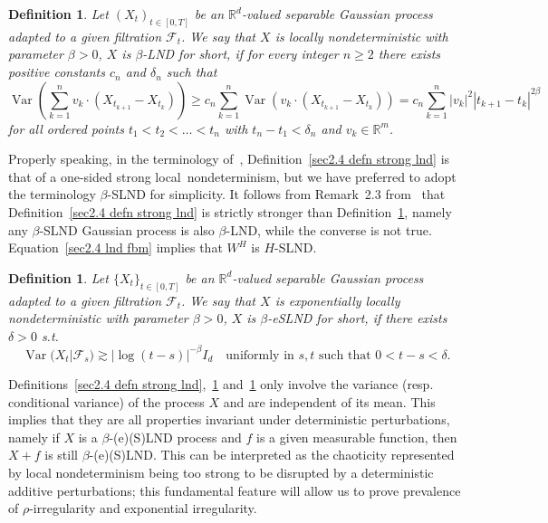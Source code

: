 \documentclass[10pt]{article}
\newcommand{\nobracket}{}
\newcommand{\tmop}[1]{\ensuremath{\operatorname{#1}}}
\newtheorem{definition}[theorem]{Definition}
\begin{document}
\begin{definition}
  \label{sec2.4 defn lnd}Let $(X_t)_{t \in [0, T]}$ be an
  $\mathbb{R}^d$-valued separable Gaussian process adapted to a given
  filtration $\mathcal{F}_t$. We say that $X$ is locally nondeterministic with
  parameter $\beta > 0$, $X$ is $\beta$\mbox{-}LND for short, if for every
  integer $n \geqslant 2$ there exists positive constants $c_n$ and $\delta_n$
  such that
  \begin{equation}
    \tmop{Var} \left( \sum_{k = 1}^n v_k \cdot (X_{t_{k + 1}} - X_{t_k})
    \right) \geqslant c_n \sum_{k = 1}^n \tmop{Var} (v_k \cdot (X_{t_{k + 1}}
    - X_{t_k})) = c_n \sum_{k = 1}^n | v_k |^2  | t_{k + 1} - t_k |^{2 \beta}
    \label{sec2.4 defn lnd eq}
  \end{equation}
  for all ordered points $t_1 < t_2 < \ldots < t_n$ with $t_n - t_1 <
  \delta_n$ and $v_k \in \mathbb{R}^m$.
\end{definition}

Properly speaking, in the terminology of~{\cite{xiao}}, Definition~\ref{sec2.4
defn strong lnd} is that of a one\mbox{-}sided strong local~nondeterminism,
but we have preferred to adopt the terminology $\beta$\mbox{-}SLND for
simplicity. It follows from Remark~2.3 from~{\cite{xiao}} that
Definition~\ref{sec2.4 defn strong lnd} is strictly stronger than
Definition~\ref{sec2.4 defn lnd}, namely any $\beta$\mbox{-}SLND Gaussian
process is also $\beta$\mbox{-}LND, while the converse is not true.
Equation~{\eqref{sec2.4 lnd fbm}} implies that $W^H$ is $H$\mbox{-}SLND.

\begin{definition}
  \label{sec2.4 defn exp lnd}Let $\{ X_t \}_{t \in [0, T]}$ be an
  $\mathbb{R}^d$-valued separable Gaussian process adapted to a given
  filtration $\mathcal{F}_t$. We say that $X$ is exponentially locally
  nondeterministic with parameter $\beta > 0$, $X$ is $\beta$\mbox{-}eSLND for
  short, if there exists $\delta > 0$ s.t.
  \begin{equation}
    \tmop{Var} (X_t | \mathcal{F}_s \nobracket) \gtrsim | \log (t - s) |^{-
    \beta} I_d \quad \text{uniformly in } s, t \text{ such that } 0 < t - s <
    \delta . \label{sec2.4 exp lnd eq}
  \end{equation}
\end{definition}

\begin{remark}
  \label{sec2.4 remark invariance lnd}Definitions~\ref{sec2.4 defn strong
  lnd},~\ref{sec2.4 defn lnd} and~\ref{sec2.4 defn exp lnd} only involve the
  variance (resp. conditional variance) of the process $X$ and are independent
  of its mean. This implies that they are all properties invariant under
  deterministic perturbations, namely if $X$ is a $\beta$\mbox{-}(e)(S)LND
  process and $f$ is a given measurable function, then $X + f$ is still
  $\beta$\mbox{-}(e)(S)LND. This can be interpreted as the chaoticity
  represented by local nondeterminism being too strong to be disrupted by a
  deterministic additive perturbations; this fundamental feature will allow us
  to prove prevalence of $\rho$\mbox{-}irregularity and exponential
  irregularity.
\end{remark}
\end{document}
